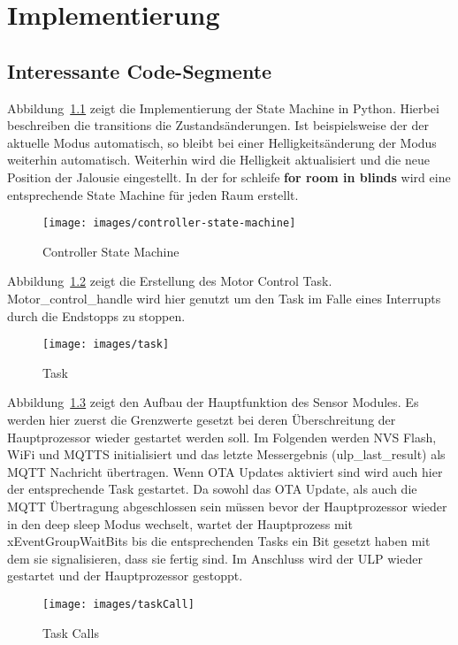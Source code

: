 \chapter{Implementierung}
\label{cha:Implementierung}

\section{Interessante Code-Segmente}

Abbildung~\ref{fig:controller-state-machine} zeigt die Implementierung der State Machine in Python. Hierbei beschreiben die transitions die Zustandsänderungen. Ist beispielsweise der der aktuelle Modus automatisch, so bleibt bei einer Helligkeitsänderung der Modus weiterhin automatisch. Weiterhin wird die Helligkeit aktualisiert und die neue Position der Jalousie eingestellt.
In der for schleife \textbf{for room in blinds} wird eine entsprechende State Machine für jeden Raum erstellt.
\begin{figure}[hbt]
	\centering
	\texttt{[image: images/controller-state-machine]}
	\caption[Code Segment Controller State Machine]{Controller State Machine}
	\label{fig:controller-state-machine}
\end{figure}

Abbildung~\ref{fig:task} zeigt die Erstellung des Motor Control Task. Motor\_control\_handle wird hier genutzt um den Task im Falle eines Interrupts durch die Endstopps zu stoppen.
\begin{figure}[hbt]
	\centering
	\texttt{[image: images/task]}
	\caption[Code Segment Task]{Task}
	\label{fig:task}
\end{figure}

Abbildung~\ref{fig:task-calls} zeigt den Aufbau der Hauptfunktion des Sensor Modules. Es werden hier zuerst die Grenzwerte gesetzt bei deren Überschreitung der Hauptprozessor wieder gestartet werden soll. Im Folgenden werden NVS Flash, WiFi und MQTTS initialisiert und das letzte Messergebnis (ulp\_last\_result) als MQTT Nachricht übertragen. Wenn OTA Updates aktiviert sind wird auch hier der entsprechende Task gestartet. Da sowohl das OTA Update, als auch die MQTT Übertragung abgeschlossen sein müssen bevor der Hauptprozessor wieder in den deep sleep Modus wechselt, wartet der Hauptprozess mit xEventGroupWaitBits bis die entsprechenden Tasks ein Bit gesetzt haben mit dem sie signalisieren, dass sie fertig sind. Im Anschluss wird der ULP wieder gestartet und der Hauptprozessor gestoppt.
\begin{figure}[hbt]
	\centering
	\texttt{[image: images/taskCall]}
	\caption[Code Segment Task Calls]{Task Calls}
	\label{fig:task-calls}
\end{figure}



